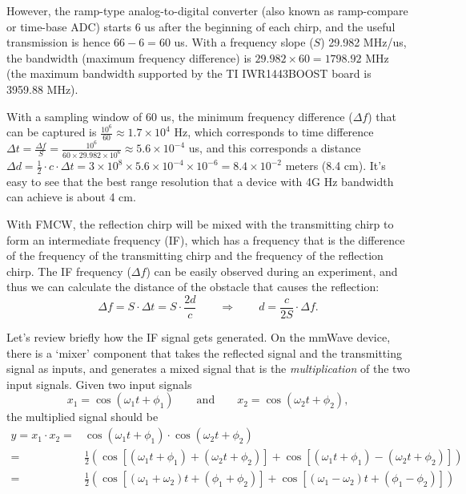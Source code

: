 \documentclass[11pt, oneside]{article}   	%
\begin{document}
However, the ramp-type analog-to-digital converter (also known as ramp-compare or time-base ADC) starts 6 us after the beginning of each chirp, and the useful transmission is hence $66 - 6 = 60$ us. With a frequency slope ($S$) 29.982 MHz/us, the bandwidth (maximum frequency difference) is $29.982 \times 60 = 1798.92$ MHz (the maximum bandwidth supported by the TI IWR1443BOOST board is 3959.88 MHz).

With a sampling window of 60 us, the minimum frequency difference ($\Delta f$) that can be captured is $\frac{10^6}{60} \approx 1.7\times 10^4$ Hz, which corresponds to time difference $\Delta t = \frac{\Delta f}{S} = \frac{10^6}{60\times 29.982 \times 10^6} \approx 5.6\times 10^{-4}$ us, and this corresponds a distance $\Delta d = \frac{1}{2}\cdot c\cdot \Delta t = 3\times 10^8 \times 5.6\times 10^{-4}\times 10^{-6} = 8.4\times 10^{-2}$ meters (8.4 cm). It's easy to see that the best range resolution that a device with 4G Hz bandwidth can achieve is about 4 cm.

With FMCW, the reflection chirp will be mixed with the transmitting chirp to form an intermediate frequency (IF), which has a frequency that is the difference of the frequency of the transmitting chirp and the frequency of the reflection chirp. The IF frequency ($\Delta f$) can be easily observed during an experiment, and thus we can calculate the distance of the obstacle that causes the reflection: 
$$\Delta f = S\cdot \Delta t = S\cdot \frac{2d}{c} \qquad \Rightarrow \qquad d = \frac{c}{2S}\cdot \Delta f.$$

Let's review briefly how the IF signal gets generated. On the mmWave device, there is a `mixer'  component that takes the reflected signal and the transmitting signal as inputs, and generates a mixed signal that is the \emph{multiplication} of the two input signals. Given two input signals 
$$x_1 = \cos(\omega_1 t + \phi_1) \qquad \text{and}\qquad x_2 = \cos(\omega_2 t + \phi_2),$$
the multiplied signal should be 
\begin{align*}
y = x_1 \cdot x_2  = & \cos(\omega_1 t + \phi_1) \cdot \cos(\omega_2 t + \phi_2) \\
= & \frac{1}{2}\left(\cos\left[(\omega_1 t +\phi_1)+ (\omega_2 t +\phi_2)\right]+ \cos\left[(\omega_1 t +\phi_1)- (\omega_2 t +\phi_2)\right]\right)\\
= & \frac{1}{2}\left(\cos\left[(\omega_1 +\omega_2) t + (\phi_1 +\phi_2)\right]+ \cos\left[(\omega_1 - \omega_2) t + (\phi_1 - \phi_2)\right]\right)
\end{align*}
\end{document}
